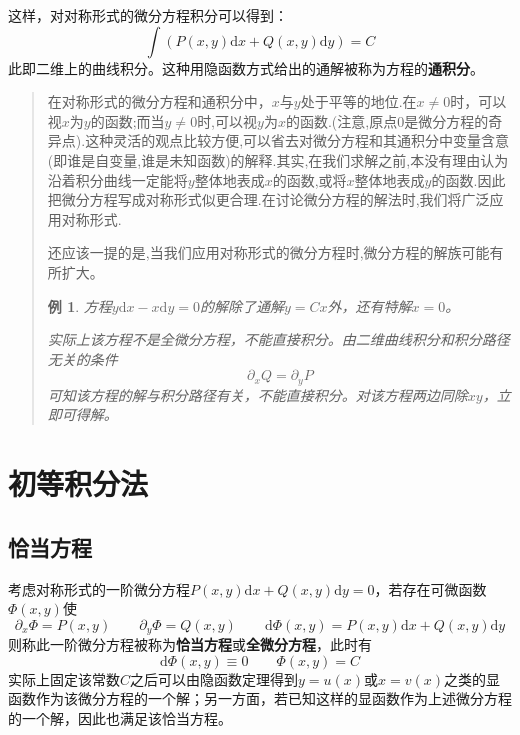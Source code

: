\documentclass[UTF8]{book}
\renewcommand{\d}{\mathrm{d}}
\newtheorem{example}{例}
\begin{document}
    这样，对对称形式的微分方程积分可以得到：$$ \int (P(x,y)\d x+Q(x,y)\d y)=C$$
    此即二维上的曲线积分。这种用隐函数方式给出的通解被称为方程的\textbf{通积分}。
    \begin{quotation}
        在对称形式的微分方程和通积分中，$ x $与$ y $处于平等的地位.在$ x\neq 0 $时，可以视$ x $为$ y $的函数;而当$ y\neq 0 $时,可以视$ y $为$ x $的函数.(注意,原点0是微分方程的奇异点).这种灵活的观点比较方便,可以省去对微分方程和其通积分中变量含意(即谁是自变量,谁是未知函数)的解释.其实,在我们求解之前,本没有理由认为沿着积分曲线一定能将$ y $整体地表成$ x $的函数,或将$ x $整体地表成$ y $的函数.因此把微分方程写成对称形式似更合理.在讨论微分方程的解法时,我们将广泛应用对称形式.
        
        还应该一提的是,当我们应用对称形式的微分方程时,微分方程的解族可能有所扩大。
        \begin{example}
            方程$ y\d x-x\d y=0 $的解除了通解$ y=Cx $外，还有特解$ x=0 $。

            实际上该方程不是全微分方程，不能直接积分。由二维曲线积分和积分路径无关的条件$$ \partial_x Q=\partial_y P $$可知该方程的解与积分路径有关，不能直接积分。对该方程两边同除$ xy $，立即可得解。
        \end{example}
    \end{quotation}
    \chapter{初等积分法}
    \section{恰当方程}
    考虑对称形式的一阶微分方程$ P(x,y)\d x+Q(x,y)\d y=0 $，若存在可微函数$ \varPhi(x,y) $使$$ \partial_x \varPhi=P(x,y)\qquad \partial_y \varPhi=Q(x,y)\qquad \d \varPhi(x,y)=P(x,y)\d x+Q(x,y)\d y $$
    则称此一阶微分方程被称为\textbf{恰当方程}或\textbf{全微分方程}，此时有$$ \d \varPhi(x,y)\equiv 0\qquad \varPhi(x,y)=C $$
    实际上固定该常数$ C $之后可以由隐函数定理得到$ y=u(x) $或$ x=v(x) $之类的显函数作为该微分方程的一个解；另一方面，若已知这样的显函数作为上述微分方程的一个解，因此也满足该恰当方程。
\end{document}
